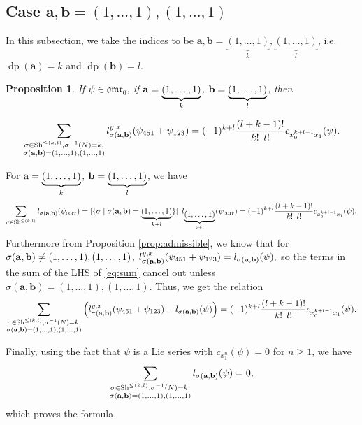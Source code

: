 \documentclass[a4paper,fleqn]{cas-sc}
\newtheorem{proposition}[theorem]{Proposition}
\DeclareMathOperator{\dpt}{dp}
\begin{document}
\subsection{Case $\textbf{a},\textbf{b} = (1,\ldots, 1),(1,\ldots,1)$}
\label{subsection:indexis1}
In this subsection, we take the indices to be $\textbf{a},\textbf{b}= \underbrace{(1,\ldots, 1)}_k,\underbrace{(1,\ldots,1)}_l$, i.e. $\dpt(\textbf{a})=k$ and $\dpt(\textbf{b})=l$.

\begin{proposition}\label{prop:nonadmissible1111} 
	If $\psi\in \mathfrak{dmr}_0$, 
    if ${\bf{a}}=\underbrace{(1,\dots,1)}_{k}$, ${\bf{b}}=\underbrace{(1,\dots,1)}_l$, then 
	
	$$
		\sum_{
			\substack{
				\sigma\in \text{Sh}^{\le (k,l)},\sigma^{-1}(N)=k,\\
				\sigma({\bf{a},\bf{b}})=(1,\dots,1),(1,\dots,1)}} l^{y,x}_{\sigma({\bf{a},\bf{b}})}(\psi_{451}+\psi_{123})=(-1)^{k+l}\frac{(l+k-1)!}{k! \hspace{0.5em} l!}c_{x^{k+l-1}_0x_1}(\psi).
	$$
\end{proposition}

\begin{pf}
	For ${\bf{a}}=\underbrace{(1,\dots,1)}_{k}$, ${\bf{b}}=\underbrace{(1,\dots,1)}_l$, we have 
$$
		\sum_{\sigma\in \text{Sh}^{\le(k,l)}}l_{\sigma(\bf{a},\bf{b})}(\psi_{\text{corr}}) = \lvert\{\sigma \mid \sigma({\bf{a},\bf{b}})=\underbrace{(1,\dots,1)}_{k+l}\} \rvert \hspace{0.5em} l_{\underbrace{(1,\dots,1)}_{k+l}}(\psi_{\text{corr}})
		=(-1)^{k+l}\frac{(l+k-1)!}{k! \hspace{0.5em}l!}c_{x^{k+l-1}_0x_1}(\psi).
$$
	Furthermore from Proposition \ref{prop:admissible}, we know that for $\sigma({\bf{a},\bf{b}})\ne (1,\dots,1),(1,\dots,1)$,
	$
		l^{y,x}_{\sigma(\bf{a},\bf{b})}(\psi_{451}+\psi_{123})=l_{\sigma(\bf{a},\bf{b})}(\psi), 
	$
	so the terms in the sum of the LHS of \eqref{eq:sum} cancel out unless $\sigma(\textbf{a}, \textbf{b})=(1, \ldots, 1),(1, \ldots, 1)$. Thus, we get the relation
	$$
		\sum_{
			\substack{
				\sigma\in \text{Sh}^{\le (k,l)},\sigma^{-1}(N)=k,\\
				\sigma({\bf{a},\bf{b}})=(1,\dots,1),(1,\dots,1)}}
                \left(l^{y,x}_{\sigma({\bf{a},\bf{b}})}(\psi_{451}+\psi_{123}) - l_{\sigma(\bf{a},\bf{b})}(\psi)\right) = (-1)^{k+l}\frac{(l+k-1)!}{k! \hspace{0.5em}l!}c_{x^{k+l-1}_0x_1}(\psi).
    $$
    
	Finally, using the fact that $\psi$ is a Lie series  with $c_{x^n_1}(\psi)=0$ for $n\ge 1$, we have
	$$
		\sum_{
			\substack{
				\sigma\in \text{Sh}^{\le (k,l)},\sigma^{-1}(N)=k,\\
				\sigma({\bf{a},\bf{b}})=(1,\dots,1),(1,\dots,1)}
		}l_{\sigma(\bf{a},\bf{b})}(\psi)=0,
	$$
    which proves the formula.
\end{pf}
\end{document}
